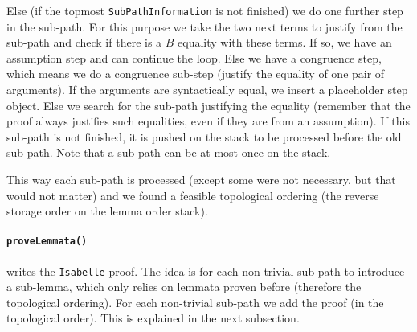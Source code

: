 \documentclass[10pt,a4paper]{article}
\newcommand{\isa}{\texttt{Isabelle}\xspace}
\newcommand{\ttt}{\texttt}
\begin{document}
Else (if the topmost \ttt{SubPathInformation} is not finished) we do one further step in the sub-path. For this purpose we take the two next terms to justify from the sub-path and check if there is a $B$ equality with these terms. If so, we have an assumption step and can continue the loop. Else we have a congruence step, which means we do a congruence sub-step (justify the equality of one pair of arguments). If the arguments are syntactically equal, we insert a placeholder step object. Else we search for the sub-path justifying the equality (remember that the proof always justifies such equalities, even if they are from an assumption). If this sub-path is not finished, it is pushed on the stack to be processed before the old sub-path. Note that a sub-path can be at most once on the stack.

This way each sub-path is processed (except some were not necessary, but that would not matter) and we found a feasible topological ordering (the reverse storage order on the lemma order stack).
%
\paragraph*{\ttt{proveLemmata()}} writes the \isa proof. The idea is for each non-trivial sub-path to introduce a sub-lemma, which only relies on lemmata proven before (therefore the topological ordering). For each non-trivial sub-path we add the proof (in the topological order). This is explained in the next subsection.
%
\end{document}
